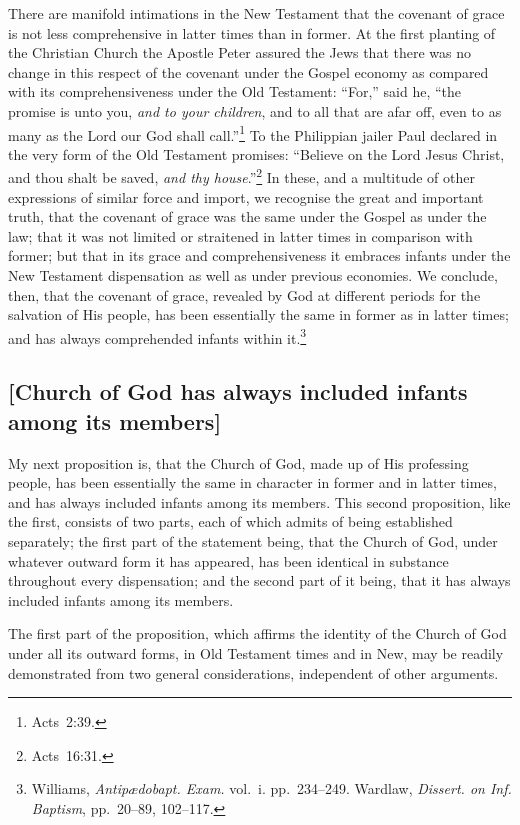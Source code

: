 \documentclass[
]{book}
\begin{document}
There are manifold intimations in the New Testament that the covenant of grace is not less comprehensive in latter times than in former. At the first planting of the Christian Church the Apostle Peter assured the Jews that there was no change in this respect of the covenant under the Gospel economy as compared with its comprehensiveness under the Old Testament: ``For,'' said he, ``the promise is unto you, \emph{and to your children}, and to all that are afar off, even to as many as the Lord our God shall call.''\footnote{Acts~2:39.} To the Philippian jailer Paul declared in the very form of the Old Testament promises: ``Believe on the Lord Jesus Christ, and thou shalt be saved, \emph{and thy house}.''\footnote{Acts~16:31.} In these, and a multitude of other expressions of similar force and import, we recognise the great and important truth, that the covenant of grace was the same under the Gospel as under the law; that it was not limited or straitened in latter times in comparison with former; but that in its grace and comprehensiveness it embraces infants under the New Testament dispensation as well as under previous economies. We conclude, then, that the covenant of grace, revealed by God at different periods for the salvation of His people, has been essentially the same in former as in latter times; and has always comprehended infants within it.\footnote{Williams, \emph{Antipædobapt. Exam.} vol.~i. pp.~234--249. Wardlaw, \emph{Dissert. on Inf. Baptism}, pp.~20--89, 102--117.}

\hypertarget{church-of-god-has-always-included-infants-among-its-members}{%
\subsection{{[}Church of God has always included infants among its members{]}}\label{church-of-god-has-always-included-infants-among-its-members}}

My next proposition is, that the Church of God, made up of His professing people, has been essentially the same in character in former and in latter times, and has always included infants among its members. This second proposition, like the first, consists of two parts, each of which admits of being established separately; the first part of the statement being, that the Church of God, under whatever outward form it has appeared, has been identical in substance throughout every dispensation; and the second part of it being, that it has always included infants among its members.

The first part of the proposition, which affirms the identity of the Church of God under all its outward forms, in Old Testament times and in New, may be readily demonstrated from two general considerations, independent of other arguments.
\end{document}
